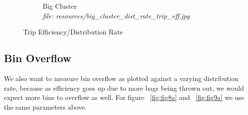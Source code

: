 \documentclass{article}
\begin{document}
\begin{figure}[H]
\begin{subfigure}[b]{.5\textwidth}
				\caption{Big Cluster\\\textit{file: resources/big\_cluster\_dist\_rate\_trip\_eff.jpg}}
				\label{fig:fig7b}
			\end{subfigure}
			\label{fig:fig7}
			\caption{Trip Efficiency/Distribution Rate}
		\end{figure}


		\subsection{Bin Overflow} \label{binof}
		We also want to measure bin overflow as plotted against a varying distribution rate, because as efficiency goes up
		due to more bags being thrown out, we would expect more bins to overflow as well. For figure ~\ref{fig:fig8a} and ~\ref{fig:fig9a}
		we use the same parameters above.
		
\end{document}
